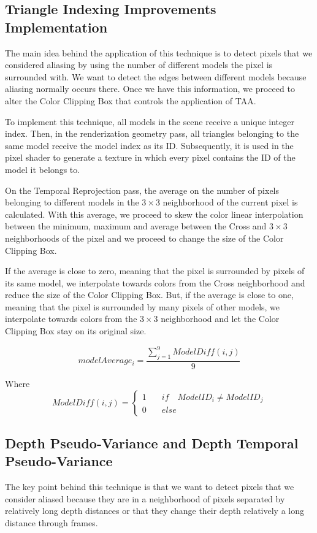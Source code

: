 \documentclass{cslthse-msc}
\begin{document}
\subsection{Triangle Indexing Improvements Implementation}
The main idea behind the application of this technique is to detect pixels that we considered aliasing by using the number of different models the pixel is surrounded with. We want to detect the edges between different models because aliasing normally occurs there. Once we have this information, we proceed to alter the Color Clipping Box that controls the application of TAA.

To implement this technique, all models in the scene receive a unique integer index. Then, in the renderization geometry pass, all triangles belonging to the same model receive the model index as its ID. Subsequently, it is used in the pixel shader to generate a texture in which every pixel contains the ID of the model it belongs to.

On the Temporal Reprojection pass, the average on the number of pixels belonging to different models in the $3\times 3$ neighborhood of the current pixel is calculated. With this average, we proceed to skew the color linear interpolation between the minimum, maximum and average between the Cross and $3\times 3$ neighborhoods of the pixel and we proceed to change the size of the Color Clipping Box. 

If the average is close to zero, meaning that the pixel is surrounded by pixels of its same model, we interpolate towards colors from the Cross neighborhood and reduce the size of the Color Clipping Box. But, if the average is close to one, meaning that the pixel is surrounded by many pixels of other models, we interpolate towards colors from the $3\times 3$ neighborhood and let the Color Clipping Box stay on its original size.

\begin{equation}\label{eq:model_index_acc}
modelAverage_i = \frac{\sum\limits_{j=1}^{9} ModelDiff(i,j)}{9} 
\end{equation}

Where
\begin{equation*}
ModelDiff(i,j) = \left\lbrace \begin{split}1\quad & if\quad ModelID_i \neq ModelID_j \\ 0\quad & else\end{split} \right.
\end{equation*}

\subsection{Depth Pseudo-Variance and Depth Temporal Pseudo-Variance}
The key point behind this technique is that we want to detect pixels that we consider aliased because they are in a neighborhood of pixels separated by relatively long depth distances or that they change their depth relatively a long distance through frames. 
\end{document}
